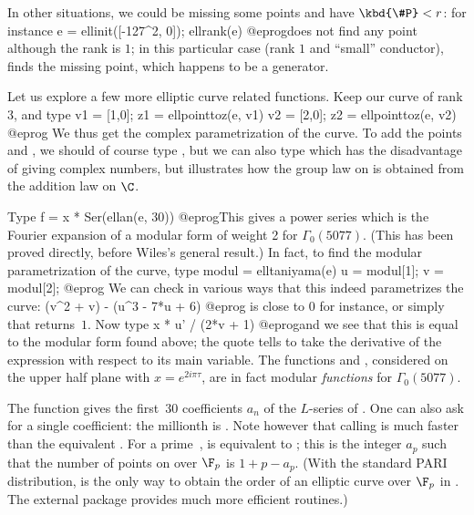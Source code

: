 In other situations, we could be missing some points and have $\kbd{\#P} <
r$: for instance
\bprog
  e = ellinit([-127^2, 0]);
  ellrank(e)
@eprog\noindent does not find any point although the rank is $1$; in this
particular case (rank $1$ and ``small'' conductor),  finds
the missing point, which happens to be a generator.

\smallskip

Let us explore a few more elliptic curve related functions. Keep our
curve  of rank 3, and type
\bprog
  v1 = [1,0]; z1 = ellpointtoz(e, v1)
  v2 = [2,0]; z2 = ellpointtoz(e, v2)
@eprog\noindent
We thus get the complex parametrization of the curve. To add the points
 and , we should of course type ,
but we can also type  which has the disadvantage
of giving complex numbers, but illustrates how the group law on  is
obtained from the addition law on $\C$.

Type
\bprog
  f = x * Ser(ellan(e, 30))
@eprog\noindent This gives a power series which is the Fourier expansion of a
modular form of weight 2 for $\Gamma_0(5077)$. (This has been proved
directly, before Wiles's general result.) In fact, to find the modular
parametrization of the curve, type
\bprog
  modul = elltaniyama(e)
  u = modul[1];
  v = modul[2];
@eprog\noindent
We can check in various ways that this indeed parametrizes the curve:
\bprog
  (v^2 + v) - (u^3 - 7*u + 6)
@eprog\noindent
is close to $0$ for instance, or simply that 
returns~$1$. Now type
\bprog
  x * u' / (2*v + 1)
@eprog\noindent and we see that this is equal to the modular form 
found above; the quote  tells  to take the derivative of the
expression with respect to its main variable. The functions  and
, considered on the upper half plane with $x=e^{2i\pi\tau}$, are in
fact modular \emph{functions} for $\Gamma_0(5077)$. \smallskip

The function  gives the first~$30$ coefficients
$a_n$ of the $L$-series of .  One can also ask for a single
coefficient: the millionth is .  Note however
that calling  is much faster than
the equivalent .  For a
prime~,
 is equivalent to ;  this is the
integer $a_p$ such that the number of points on  over $\F_p$ is
$1+p-a_p$. (With the standard PARI distribution,  is the only way
to obtain the order of an elliptic curve over $\F_p$ in . The
external package  provides much more efficient routines.)

